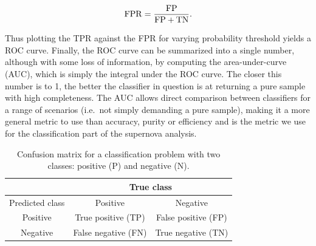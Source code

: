 \begin{equation}
 \rm{FPR} = \frac{\rm{FP}}{\rm{FP}+\rm{TN}}.
\end{equation}

Thus plotting the TPR against the FPR for varying probability threshold yields
a ROC curve.  Finally, the ROC curve can be summarized into a single number,
although with some loss of information, by computing the area-under-curve
(AUC), which is simply the integral under the ROC curve. The closer this
number is to 1, the better the classifier in question is at returning a pure
sample with high completeness. The AUC allows direct comparison between
classifiers for a range of scenarios (i.e.\ not simply demanding a pure
sample), making it a more general metric to use than accuracy, purity or
efficiency and is the metric we use for the classification part of the
supernova analysis.

\begin{table}
\centering
 \begin{tabular}{|c|c|c|}
 \hline
  & \multicolumn{2}{|c|}{True class}\\
  \hline
  Predicted class & Positive & Negative\\
  \hline
  Positive & True positive (TP) & False positive (FP)\\ 
  \hline
  Negative & False negative (FN) & True negative (TN)\\
  \hline
 \end{tabular}

 \label{table:confusion}
 \caption{Confusion matrix for a classification problem with two classes: positive (P) and negative 
(N).}
\end{table}



